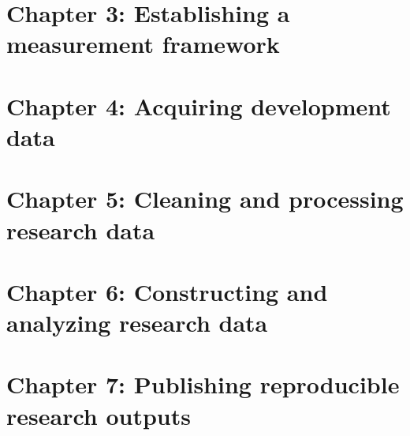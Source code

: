 \chapter{Chapter 3: Establishing a measurement framework}
\label{ch:3}






\chapter{Chapter 4: Acquiring development data}
\label{ch:4}






\chapter{Chapter 5: Cleaning and processing research data}
\label{ch:5}




\chapter{Chapter 6: Constructing and analyzing research data}
\label{ch:6}




\chapter{Chapter 7: Publishing reproducible research outputs}
\label{ch:7}



